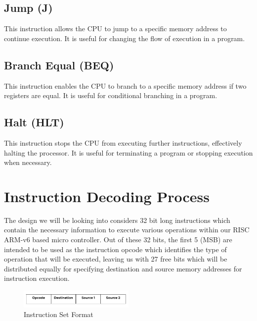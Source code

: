 \documentclass[9pt,a4paper,twoside]{tau}
\begin{document}
    
        \subsection{Jump (J)}
        This instruction allows the CPU to jump to a specific memory address to continue execution. It is useful for changing the flow of execution in a program. 
        \subsection{Branch Equal (BEQ)}
        This instruction enables the CPU to branch to a specific memory address if two registers are equal. It is useful for conditional branching in a program. 
        \subsection{Halt (HLT)}
        This instruction stops the CPU from executing further instructions, effectively halting the processor. It is useful for terminating a program or stopping execution when necessary.



    
        
        \section{Instruction Decoding Process}


        The design we will be looking into considers 32 bit long instructions which contain the necessary information to execute various operations within our RISC ARM-v6 based micro controller. Out of these 32 bits, the first 5 (MSB) are intended to be used as the instruction opcode which identifies the type of operation that will be executed, leaving us with 27 free bits which will be distributed equally for specifying destination and source memory addresses for instruction execution. 

        \begin{figure}[h]  %
            \centering  %
            \includegraphics[width=0.5\textwidth]{images/ISA.JPG}
            \caption{Instruction Set Format}
            \label{fig:ISA Format}
        \end{figure}
\end{document}
